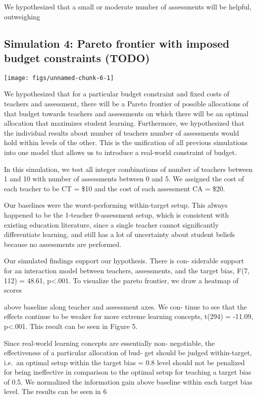 \documentclass[10pt, letterpaper]{article}
\newenvironment{CodeChunk}{}{}
\begin{document}
We hypothesized that a small or moderate number of assessments will be
helpful, outweighing

\subsection{Simulation 4: Pareto frontier with imposed budget
constraints
(TODO)}\label{simulation-4-pareto-frontier-with-imposed-budget-constraints-todo}

\begin{CodeChunk}

\texttt{[image: figs/unnamed-chunk-6-1]} \end{CodeChunk}

We hypothesized that for a particular budget constraint and fixed costs
of teachers and assessment, there will be a Pareto frontier of possible
allocations of that budget towards teachers and assessments on which
there will be an optimal allocation that maximizes student learning.
Furthermore, we hypothesized that the individual results about number of
teachers number of assessments would hold within levels of the other.
This is the unification of all previous simulations into one model that
allows us to introduce a real-world constraint of budget.

In this simulation, we test all integer combinations of number of
teachers between 1 and 10 with number of assessments between 0 and 5. We
assigned the cost of each teacher to be CT = \$10 and the cost of each
assessment CA = \$20.

Our baselines were the worst-performing within-target setup. This always
happened to be the 1-teacher 0-assessment setup, which is consistent
with existing education literature, since a single teacher cannot
significantly differentiate learning, and still has a lot of uncertainty
about student beliefs because no assessments are performed.

Our simulated findings support our hypothesis. There is con- siderable
support for an interaction model between teachers, assessments, and the
target bias, F(7, 112) = 48.61, p\textless{}.001. To visualize the
pareto frontier, we draw a heatmap of scores

above baseline along teacher and assessment axes. We con- tinue to see
that the effects continue to be weaker for more extreme learning
concepts, t(294) = -11.09, p\textless{}.001. This result can be seen in
Figure 5.

Since real-world learning concepts are essentially non- negotiable, the
effectiveness of a particular allocation of bud- get should be judged
within-target, i.e.~an optimal setup within the target bias = 0.8 level
should not be penalized for being ineffective in comparison to the
optimal setup for teaching a target bias of 0.5. We normalized the
information gain above baseline within each target bias level. The
results can be seen in 6
\end{document}
